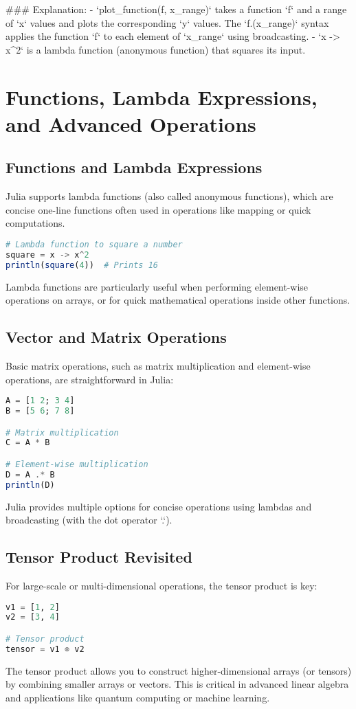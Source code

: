 \documentclass[a4paper,12pt]{article}
\begin{document}
### Explanation:
- `plot_function(f, x_range)` takes a function `f` and a range of `x` values and plots the corresponding `y` values. The `f.(x_range)` syntax applies the function `f` to each element of `x_range` using broadcasting.
- `x -> x^2` is a lambda function (anonymous function) that squares its input.

\section{Functions, Lambda Expressions, and Advanced Operations}

\subsection{Functions and Lambda Expressions}
Julia supports lambda functions (also called anonymous functions), which are concise one-line functions often used in operations like mapping or quick computations.

\begin{lstlisting}[language=Julia]
# Lambda function to square a number
square = x -> x^2
println(square(4))  # Prints 16
\end{lstlisting}

Lambda functions are particularly useful when performing element-wise operations on arrays, or for quick mathematical operations inside other functions.

\subsection{Vector and Matrix Operations}
Basic matrix operations, such as matrix multiplication and element-wise operations, are straightforward in Julia:

\begin{lstlisting}[language=Julia]
A = [1 2; 3 4]
B = [5 6; 7 8]

# Matrix multiplication
C = A * B

# Element-wise multiplication
D = A .* B
println(D)
\end{lstlisting}

Julia provides multiple options for concise operations using lambdas and broadcasting (with the dot operator `.`).

\subsection{Tensor Product Revisited}
For large-scale or multi-dimensional operations, the tensor product is key:

\begin{lstlisting}[language=Julia]
v1 = [1, 2]
v2 = [3, 4]

# Tensor product
tensor = v1 ⊗ v2
\end{lstlisting}

The tensor product allows you to construct higher-dimensional arrays (or tensors) by combining smaller arrays or vectors. This is critical in advanced linear algebra and applications like quantum computing or machine learning.
\end{document}
